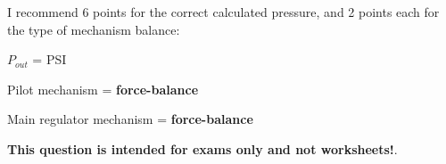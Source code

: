 
I recommend 6 points for the correct calculated pressure, and 2 points each for the type of mechanism balance:

\vskip 10pt

\noindent
$P_{out}$ =  PSI
 
\vskip 10pt

\noindent
Pilot mechanism = {\bf force-balance}

\vskip 10pt

\noindent
Main regulator mechanism = {\bf force-balance}








{\bf This question is intended for exams only and not worksheets!}.



